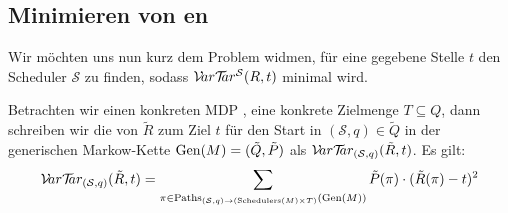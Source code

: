 \documentclass[a4paper]{article}
\newcommand{\mc}{Markow-Kette}
\theoremstyle{nonumberplain}
\begin{document}
	\subsection{Minimieren von \vt{}en}
	
	Wir möchten uns nun kurz dem Problem widmen, für eine gegebene Stelle $t$ den Scheduler $\mathcal{S}$ zu finden, sodass $\mathcal{V}\!ar \mathcal{T}\!\!ar^{\mathcal{S}}(R,t)$ minimal wird.
	\begin{comment}
	Unter den getroffenen Voraussetzungen existiert tatsächlich immer ein Minimum, wie wir im Folgenden sehen werden. Dazu beschreiben wir eine Funktion
	\[
	f : Q \times \mathbb{R} \to \mathbb{R} \times A : (q,t) \mapsto (\nu,\alpha)\text{,}
	\]
	welche die zu wählende Aktion $\alpha$ und die resultierende \vt{} $\nu$ 
	\end{comment} 
	Betrachten wir einen konkreten MDP \mdpex{}, eine konkrete Zielmenge $T\subseteq Q$, dann schreiben wir die \vt{} von $\tilde{R}$ zum Ziel $t$ für den Start in $(\mathcal{S},q) \in \tilde{Q}$ in der generischen \mc{} $\mathrm{Gen}(M)=(\tilde{Q},\tilde{P})$ als $\mathcal{V}\!ar \mathcal{T}\!\!ar_{(\mathcal{S},q)}(\tilde{R},t)$. Es gilt:
	\[
	\mathcal{V}\!ar \mathcal{T}\!\!ar_{(\mathcal{S},q)}(\tilde{R},t) = \sum_{\pi \in \mathrm{Paths}_{(\mathcal{S},q) \rightarrow (\mathrm{Schedulers}(M)\times T)}(\mathrm{Gen}(M))}{	\tilde{P}(\pi) \cdot (\tilde{R}(\pi) - t)^2}
	\]
	
\end{document}
